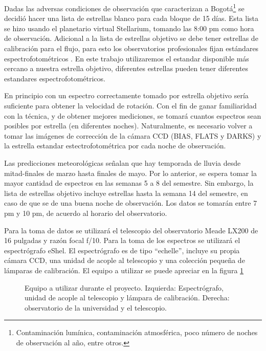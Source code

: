 \documentclass[notitlepage,letterpaper,12pt]{article} %
\begin{document}
Dadas las adversas condiciones de observación que caracterizan a Bogotá\footnote{Contaminación lumínica, contaminación atmosférica, poco número de noches de observación al año, entre otros.} se decidió hacer una lista de estrellas blanco para cada bloque de 15 días. Esta lista se hizo usando el planetario virtual Stellarium, tomando las 8:00 pm como hora de observación.
Adicional a la lista de estrellas objetivo se debe tener estrellas de calibración para el flujo, para esto los observatorios profesionales fijan estándares espectrofotométricos \cite{flux4Hubble}. En este trabajo utilizaremos el estandar disponible más cercano a nuestra estrella objetivo, diferentes estrellas pueden tener diferentes estandares espectrofotométricos.

En principio con un espectro correctamente tomado por estrella objetivo sería suficiente para obtener la velocidad de rotación. Con el fin de ganar familiaridad con la técnica, y de obtener mejores mediciones, se tomará cuantos espectros sean posibles por estrella (en diferentes noches). Naturalmente, es necesario volver a tomar las imágenes de corrección de la cámara CCD (BIAS, FLATS y DARKS) y la estrella estandar estectrofotométrica por cada noche de observación.

Las predicciones meteorológicas señalan que hay temporada de lluvia desde mitad-finales de marzo hasta finales de mayo. Por lo anterior, se espera tomar la mayor cantidad de espectros en las semanas 5 a 8 del semestre. Sin embargo, la lista de estrellas objetivo incluye estrellas hasta la semana 14 del semestre, en caso de que se de una buena noche de observación. Los datos se tomarán entre 7 pm y 10 pm, de acuerdo al horario del observatorio. 

Para la toma de datos se utilizará el telescopio del observatorio Meade LX200 de 16 pulgadas y razón focal f/10. Para la toma de los espectros se utilizará el espectrógrafo eShel. El espectrógrafo es de tipo \enquote{echelle}, incluye su propia cámara CCD, una unidad de acople al telescopio y una colección pequeña de lámparas de calibración. El equipo a utilizar se puede apreciar en la figura \ref{equipo}




\begin{figure}[h!]
  \caption{Equipo a utilizar durante el proyecto. Izquierda: Espectrógrafo, unidad de acople al telescopio y lámpara de calibración. Derecha: observatorio de la universidad y el telescopio.}
  \label{equipo}
\end{figure}
\end{document}
